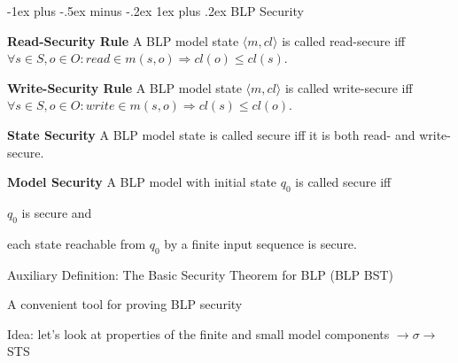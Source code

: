 \documentclass[a4paper]{article}
\makeatletter
\renewcommand{\note}[2]{\begin{noteBox} \textbf{#1} #2 \end{noteBox}}
\renewcommand{\subsubsection}{\@startsection{subsubsection}{3}{0mm}%
                {-1ex plus -.5ex minus -.2ex}%
                {1ex plus .2ex}%
                {\normalfont\small\bfseries}}
\makeatother
\begin{document}
\begin{multicols}{3}
    \subsubsection{BLP Security}
    \note{Read-Security Rule}{A BLP model state $\langle m,cl\rangle$ is called read-secure iff $\forall s\in S,o\in O:read\in m(s,o)\Rightarrow cl(o) \leq cl(s)$.}

    \note{Write-Security Rule}{A BLP model state $\langle m,cl\rangle$ is called write-secure iff $\forall s\in S,o\in O:write\in m(s,o)\Rightarrow cl(s)\leq cl(o)$.}

    \note{State Security}{A BLP model state is called secure iff it is both read- and write-secure.}

    \note{Model Security}{A BLP model with initial state $q_0$ is called secure iff
        \begin{enumerate*}
            \item $q_0$ is secure and
            \item each state reachable from $q_0$ by a finite input sequence is secure.
        \end{enumerate*}
    }

    Auxiliary Definition: The Basic Security Theorem for BLP (BLP BST)
    \begin{itemize*}
        \item A convenient tool for proving BLP security
        \item Idea: let’s look at properties of the finite and small model components $\rightarrow\sigma\rightarrow$ STS
    \end{itemize*}


\end{multicols}
\end{document}
